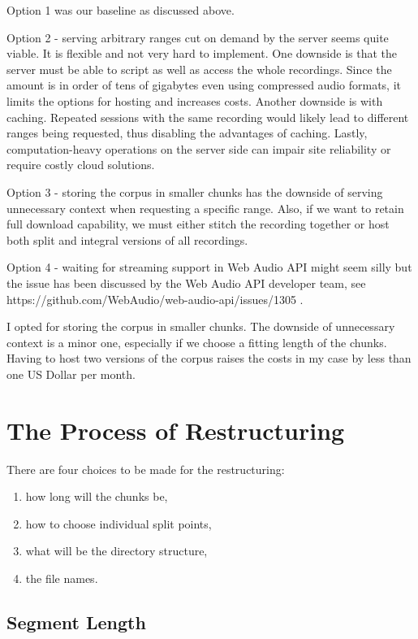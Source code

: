 \documentclass[runningheads]{llncs}
\begin{document}
Option 1 was our baseline as discussed above.

Option 2 - serving arbitrary ranges cut on demand by the server seems quite
viable. It is flexible and not very hard to implement. One downside is that the
server must be able to script as well as access the whole recordings. Since the
amount is in order of tens of gigabytes even using compressed audio formats, it
limits the options for hosting and increases costs. Another downside is with
caching. Repeated sessions with the same recording would likely lead to
different ranges being requested, thus disabling the advantages of caching.
Lastly, computation-heavy operations on the server side can impair site
reliability or require costly cloud solutions.

Option 3 - storing the corpus in smaller chunks has the downside of serving unnecessary context when requesting a specific range. Also, if we want to retain full download capability, we must either stitch the recording together or host both split and integral versions of all recordings. 

Option 4 - waiting for streaming support in Web Audio API might seem silly but the issue has been discussed by the Web Audio API developer team, see https://github.com/WebAudio/web-audio-api/issues/1305 .

I opted for storing the corpus in smaller chunks. The downside of unnecessary context is a minor one, especially if we choose a fitting length of the chunks. Having to host two versions of the corpus raises the costs in my case by less than one US Dollar per month.

\section{The Process of Restructuring}

There are four choices to be made for the restructuring: 
\begin{enumerate}
    \item{how long will the chunks be,}
    \item{how to choose individual split points,}
    \item{what will be the directory structure,}
    \item{the file names.}
\end{enumerate}

\subsection{Segment Length}
\end{document}
